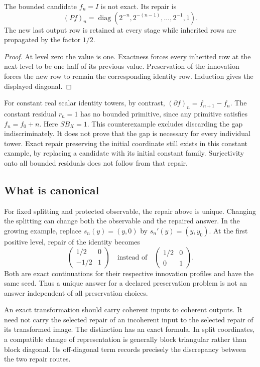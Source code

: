 \begin{KSexample}\label{KS:KS22}
The bounded candidate \(f_n=I\) is not exact. Its repair is
\[
 (Pf)_n=\operatorname{diag}(2^{-n},2^{-(n-1)},\ldots,2^{-1},1).
\]
The new last output row is retained at every stage while inherited rows are propagated by the factor \(1/2\).
\end{KSexample}
\begin{proof}
At level zero the value is one. Exactness forces every inherited row at the next level to be one half of its previous value. Preservation of the innovation forces the new row to remain the corresponding identity row. Induction gives the displayed diagonal.
\end{proof}
For constant real scalar identity towers, by contrast, \((\partial f)_n=f_{n+1}-f_n\). The constant residual \(r_n=1\) has no bounded primitive, since any primitive satisfies \(f_n=f_0+n\). Here \(SB_X=1\). This counterexample excludes discarding the gap indiscriminately. It does not prove that the gap is necessary for every individual tower. Exact repair preserving the initial coordinate still exists in this constant example, by replacing a candidate with its initial constant family. Surjectivity onto all bounded residuals does not follow from that repair.

\subsection{What is canonical}
For fixed splitting and protected observable, the repair above is unique. Changing the splitting can change both the observable and the repaired answer. In the growing example, replace \(s_n(y)=(y,0)\) by \(s_n'(y)=(y,y_0)\). At the first positive level, repair of the identity becomes
\[
 \begin{pmatrix}1/2&0\\-1/2&1\end{pmatrix}
 \quad\text{instead of}\quad
 \begin{pmatrix}1/2&0\\0&1\end{pmatrix}.
\]
Both are exact continuations for their respective innovation profiles and have the same seed. Thus a unique answer for a declared preservation problem is not an answer independent of all preservation choices.


\label{KS:sec:repair-transport}
An exact transformation should carry coherent inputs to coherent outputs. It need not carry the selected repair of an incoherent input to the selected repair of its transformed image. The distinction has an exact formula. In split coordinates, a compatible change of representation is generally block triangular rather than block diagonal. Its off-diagonal term records precisely the discrepancy between the two repair routes.

